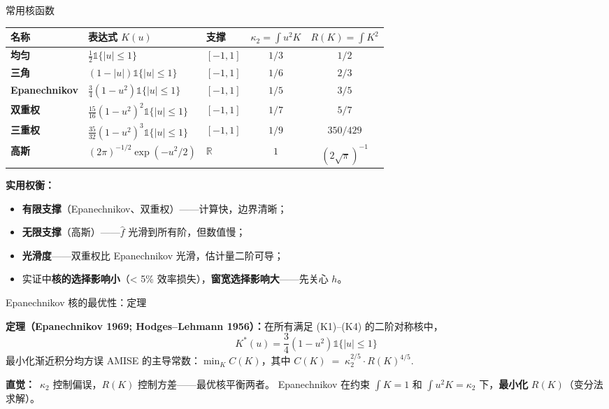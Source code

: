 \documentclass[aspectratio=169, 10pt]{beamer}
\renewcommand{\arraystretch}{1.05}
\begin{document}
\begin{frame}{常用核函数}
  \centering\small
  \renewcommand{\arraystretch}{1.3}
  \begin{tabular}{@{}lllcc@{}}
    \toprule
    \textbf{名称} & \textbf{表达式} $K(u)$ & \textbf{支撑} & $\kappa_2=\int u^2 K$ & $R(K)=\int K^2$ \\
    \midrule
    \textbf{均匀}       & $\tfrac{1}{2}\mathds{1}\{|u|\leq 1\}$ & $[-1,1]$ & $1/3$   & $1/2$ \\
    \textbf{三角}       & $(1-|u|)\mathds{1}\{|u|\leq 1\}$       & $[-1,1]$ & $1/6$   & $2/3$ \\
    \textbf{Epanechnikov}& $\tfrac{3}{4}(1-u^2)\mathds{1}\{|u|\leq 1\}$ & $[-1,1]$ & $1/5$ & $3/5$ \\
    \textbf{双重权}     & $\tfrac{15}{16}(1-u^2)^2\mathds{1}\{|u|\leq 1\}$ & $[-1,1]$ & $1/7$ & $5/7$ \\
    \textbf{三重权}     & $\tfrac{35}{32}(1-u^2)^3\mathds{1}\{|u|\leq 1\}$ & $[-1,1]$ & $1/9$ & $350/429$ \\
    \textbf{高斯}       & $(2\pi)^{-1/2}\exp(-u^2/2)$            & $\mathbb{R}$ & $1$   & $(2\sqrt{\pi})^{-1}$ \\
    \bottomrule
  \end{tabular}


  \begin{keybox}
    \textbf{实用权衡：}
    \begin{itemize}
      \item \textbf{有限支撑}（Epanechnikov、双重权）——计算快，边界清晰；
      \item \textbf{无限支撑}（高斯）——$\hat f$ 光滑到所有阶，但数值慢；
      \item \textbf{光滑度}——双重权比 Epanechnikov 光滑，估计量二阶可导；
      \item 实证中\textbf{核的选择影响小}（< 5\% 效率损失），\textbf{窗宽选择影响大}——先关心 $h$。
    \end{itemize}
  \end{keybox}

\end{frame}


\begin{frame}{Epanechnikov 核的最优性：定理}

  \begin{highlightbox}
    \textbf{定理（Epanechnikov 1969; Hodges--Lehmann 1956）：}在所有满足 (K1)--(K4) 的二阶对称核中，
    \[
      K^*(u) = \frac{3}{4}(1-u^2)\mathds{1}\{|u|\leq 1\}
    \]
    最小化渐近积分均方误 AMISE 的主导常数：$\min_K C(K)$，其中 $C(K) \;=\; \kappa_2^{2/5}\cdot R(K)^{4/5}$.
  \end{highlightbox}

  \textbf{直觉：}\ $\kappa_2$ 控制偏误，$R(K)$ 控制方差——最优核平衡两者。
  Epanechnikov 在约束 $\int K = 1$ 和 $\int u^2 K = \kappa_2$ 下，\textbf{最小化 }$R(K)$（变分法求解）。

  \hypertarget{main-b2}{}\hfill{\scriptsize\hyperlink{proof-b2}{}}

\end{frame}
\end{document}
